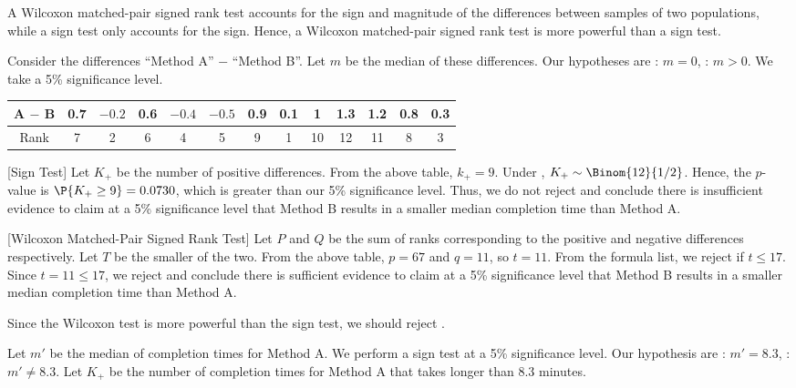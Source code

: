\begin{solution}
    A Wilcoxon matched-pair signed rank test accounts for the sign and magnitude of the differences between samples of two populations, while a sign test only accounts for the sign. Hence, a Wilcoxon matched-pair signed rank test is more powerful than a sign test.

    \begin{ppart}
        Consider the differences ``Method A'' $-$ ``Method B''. Let $m$ be the median of these differences. Our hypotheses are \nullhyp: $m = 0$, \althyp: $m > 0$. We take a 5\% significance level.

        \begin{table}[H]
            \centering
            \begin{tabular}{|c|c|c|c|c|c|c|c|c|c|c|c|c|}
            \hline
            A $-$ B & 0.7 & $-0.2$ & 0.6 & $-0.4$ & $-0.5$ & 0.9 & 0.1 & 1 & 1.3 & 1.2 & 0.8 & 0.3 \\ \hline
            Rank & 7 & 2 & 6 & 4 & 5 & 9 & 1 & 10 & 12 & 11 & 8 & 3 \\ \hline
            \end{tabular}
        \end{table}

        [Sign Test] Let $K_+$ be the number of positive differences. From the above table, $k_+ = 9$. Under \nullhyp, $K_+ \sim \Binom{12}{1/2}$. Hence, the $p$-value is $\P{K_+ \geq 9} = 0.0730$, which is greater than our 5\% significance level. Thus, we do not reject \nullhyp{} and conclude there is insufficient evidence to claim at a 5\% significance level that Method B results in a smaller median completion time than Method A.

        [Wilcoxon Matched-Pair Signed Rank Test] Let $P$ and $Q$ be the sum of ranks corresponding to the positive and negative differences respectively. Let $T$ be the smaller of the two. From the above table, $p = 67$ and $q = 11$, so $t = 11$. From the formula list, we reject \nullhyp{} if $t \leq 17$. Since $t = 11 \leq 17$, we reject \nullhyp{} and conclude there is sufficient evidence to claim at a 5\% significance level that Method B results in a smaller median completion time than Method A.

        Since the Wilcoxon test is more powerful than the sign test, we should reject \nullhyp.
    \end{ppart}
    \begin{ppart}
        Let $m'$ be the median of completion times for Method A. We perform a sign test at a 5\% significance level. Our hypothesis are \nullhyp: $m' = 8.3$, \althyp: $m' \neq 8.3$. Let $K_+$ be the number of completion times for Method A that takes longer than 8.3 minutes.


\end{ppart}
\end{solution}
